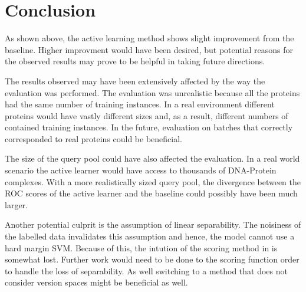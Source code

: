 \documentclass{article}
\begin{document}
\section*{Conclusion}
As shown above, the active learning method shows slight improvement from the baseline. Higher improvment would have been desired, but potential reasons for the observed results may prove to be helpful in taking future directions.

The results observed may have been extensively affected by the way the evaluation was performed. The evaluation was unrealistic because all the proteins had the same number of training instances. In a real environment different proteins would have vastly different sizes and, as a result, different numbers of contained training instances. In the future, evaluation on batches that correctly corresponded to real proteins could be beneficial. 

The size of the query pool could have also affected the evaluation. In a real world scenario the active learner would have access to thousands of DNA-Protein complexes. With a more realistically sized query pool, the divergence between the ROC scores of the active learner and the baseline could possibly have been much larger. 

Another potential culprit is the assumption of linear separability. The noisiness of the labelled data invalidates this assumption and hence, the model cannot use a hard margin SVM. Because of this, the intution of the scoring method in \cite{active_learning} is somewhat lost. Further work would need to be done to the scoring function order to handle the loss of separability. As well switching to a method that does not consider version spaces might be beneficial as well.


{}
\end{document}
